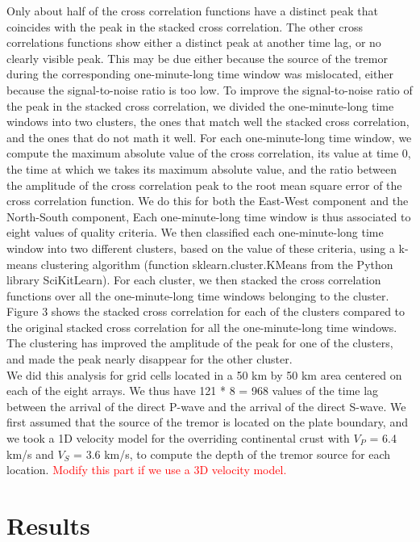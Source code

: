 \documentclass[draft]{agujournal2019}
\begin{document}
Only about half of the cross correlation functions have a distinct peak that coincides with the peak in the stacked cross correlation. The other cross correlations functions show either a distinct peak at another time lag, or no clearly visible peak. This may be due either because the source of the tremor during the corresponding one-minute-long time window was mislocated, either because the signal-to-noise ratio is too low. To improve the signal-to-noise ratio of the peak in the stacked cross correlation, we divided the one-minute-long time windows into two clusters, the ones that match well the stacked cross correlation, and the ones that do not math it well. For each one-minute-long time window, we compute the maximum absolute value of the cross correlation, its value at time 0, the time at which we takes its maximum absolute value, and the ratio between the
amplitude of the cross correlation peak to the root mean square error of the cross correlation function. We do this for both the East-West component and the North-South component, Each one-minute-long time window is thus associated to eight values of quality criteria. We then classified each one-minute-long time window into two different clusters, based on the value of these criteria, using a k-means clustering algorithm (function sklearn.cluster.KMeans from the Python library SciKitLearn). For each cluster, we then stacked the cross correlation functions over all the one-minute-long time windows belonging to the cluster. Figure 3 shows the stacked cross correlation for each of the clusters compared to the original stacked cross correlation for all the one-minute-long time windows. The clustering has improved the amplitude of the peak for one of the clusters, and made the peak nearly disappear for the other cluster. \\

We did this analysis for grid cells located in a 50 km by 50 km area centered on each of the eight arrays. We thus have 121 * 8 = 968 values of the time lag between the arrival of the direct P-wave and the arrival of the direct S-wave. We first assumed that the source of the tremor is located on the plate boundary, and we took a 1D velocity model for the overriding continental crust with $V_P$ = 6.4 km/s and $V_S$ = 3.6 km/s, to compute the depth of the tremor source for each location. \textcolor{red}{Modify this part if we use a 3D velocity model.}

\section{Results}
\end{document}
